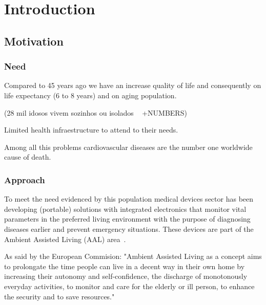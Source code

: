 
\chapter{Introduction} %

\label{Chapter1} %



\section{Motivation}

\subsection{Need}
Compared to 45 years ago we have an increase quality of life and consequently on life expectancy (6 to 8 years) and on aging population. 

(28 mil idosos vivem sozinhos ou isolados ~\cite{n_idosos} +NUMBERS) 

Limited health infraestructure to attend to their needs.

Among all this problems cardiovascular diseases are the number one worldwide cause of death.

\subsection{Approach}

To meet the need evidenced by this population medical devices sector has been developing (portable) solutions with integrated electronics that monitor vital parameters in the preferred living environment with the purpose of diagnosing diseases earlier and prevent emergency situations. These devices are part of the Ambient Assisted Living (AAL) area~\cite{jose}.

As said by the European Commision: "Ambient Assisted Living as a concept aims to prolongate the time people can live in a decent way in their own home by increasing their autonomy and self-confidence, the discharge of monotonously everyday activities, to monitor and care for the elderly or ill person, to enhance the security and to save resources."

